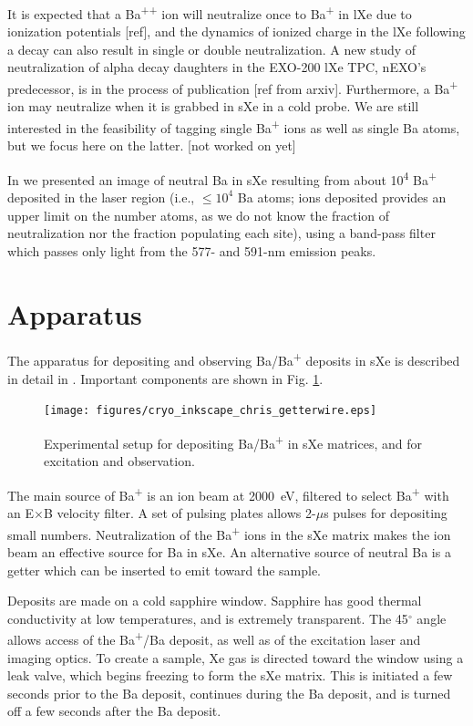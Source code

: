 \documentclass[aps,pra,reprint,superscriptaddress]{revtex4-1}
\begin{document}
{\color{gray}It is expected that a Ba\textsuperscript{++} ion will neutralize once to Ba\textsuperscript{+} in lXe due to ionization potentials [ref], and the dynamics of ionized charge in the lXe following a decay can also result in single or double neutralization.  A new study of neutralization of alpha decay daughters in the EXO-200 lXe TPC, nEXO's predecessor, is in the process of publication [ref from arxiv].  Furthermore, a Ba\textsuperscript{+} ion may neutralize when it is grabbed in sXe in a cold probe.  We are still interested in the feasibility of tagging single Ba\textsuperscript{+} ions as well as single Ba atoms, but we focus here on the latter. [not worked on yet]}

In \cite{Mong2015} we presented an image of neutral Ba in sXe resulting from about 10\textsuperscript{4} Ba\textsuperscript{+} deposited in the laser region (i.e., $\leq 10^4$ Ba atoms; ions deposited provides an upper limit on the number atoms, as we do not know the fraction of neutralization nor the fraction populating each site), using a band-pass filter which passes only light from the 577- and 591-nm emission peaks.

\section{Apparatus}

The apparatus for depositing and observing Ba/Ba\textsuperscript{+} deposits in sXe is described in detail in \cite{Mong2015}.  Important components are shown in Fig. \ref{fig:apparatus}.

\begin{figure}
\texttt{[image: figures/cryo\_inkscape\_chris\_getterwire.eps]}
\caption{Experimental setup for depositing Ba/Ba\textsuperscript{+} in sXe matrices, and for excitation and observation.}
\label{fig:apparatus}
\end{figure}

The main source of Ba\textsuperscript{+} is an ion beam at 2000~eV, filtered to select Ba\textsuperscript{+} with an E$\times$B velocity filter.  A set of pulsing plates allows 2-$\mu$s pulses for depositing small numbers.  Neutralization of the Ba\textsuperscript{+} ions in the sXe matrix makes the ion beam an effective source for Ba in sXe.  An alternative source of neutral Ba is a getter which can be inserted to emit toward the sample.

Deposits are made on a cold sapphire window.  Sapphire has good thermal conductivity at low temperatures, and is extremely transparent.  The 45$^{\circ}$ angle allows access of the Ba\textsuperscript{+}/Ba deposit, as well as of the excitation laser and imaging optics.  To create a sample, Xe gas is directed toward the window using a leak valve, which begins freezing to form the sXe matrix.  This is initiated a few seconds prior to the Ba deposit, continues during the Ba deposit, and is turned off a few seconds after the Ba deposit.  
\end{document}
